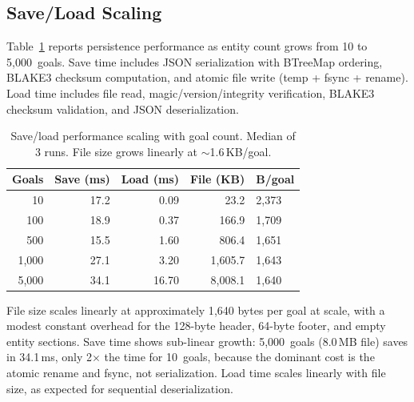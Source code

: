 \documentclass[10pt, twocolumn]{article}
\begin{document}
\subsection{Save/Load Scaling}
\label{sec:save_scaling}

Table~\ref{tab:save_scaling} reports persistence performance as entity count grows from 10 to 5{,}000~goals. Save time includes JSON serialization with BTreeMap ordering, BLAKE3 checksum computation, and atomic file write (temp + fsync + rename). Load time includes file read, magic/version/integrity verification, BLAKE3 checksum validation, and JSON deserialization.

\begin{table}[t]
\caption{Save/load performance scaling with goal count. Median of 3 runs. File size grows linearly at ${\sim}$1.6\,KB/goal.}
\label{tab:save_scaling}
\centering
\small
\begin{tabular}{@{}rrrrl@{}}
\toprule
\textbf{Goals} & \textbf{Save (ms)} & \textbf{Load (ms)} & \textbf{File (KB)} & \textbf{B/goal} \\
\midrule
10 & 17.2 & 0.09 & 23.2 & 2{,}373 \\
100 & 18.9 & 0.37 & 166.9 & 1{,}709 \\
500 & 15.5 & 1.60 & 806.4 & 1{,}651 \\
1{,}000 & 27.1 & 3.20 & 1{,}605.7 & 1{,}643 \\
5{,}000 & 34.1 & 16.70 & 8{,}008.1 & 1{,}640 \\
\bottomrule
\end{tabular}
\end{table}

File size scales linearly at approximately 1{,}640 bytes per goal at scale, with a modest constant overhead for the 128-byte header, 64-byte footer, and empty entity sections. Save time shows sub-linear growth: 5{,}000~goals (8.0\,MB file) saves in 34.1\,ms, only 2$\times$ the time for 10~goals, because the dominant cost is the atomic rename and fsync, not serialization. Load time scales linearly with file size, as expected for sequential deserialization.
\end{document}
